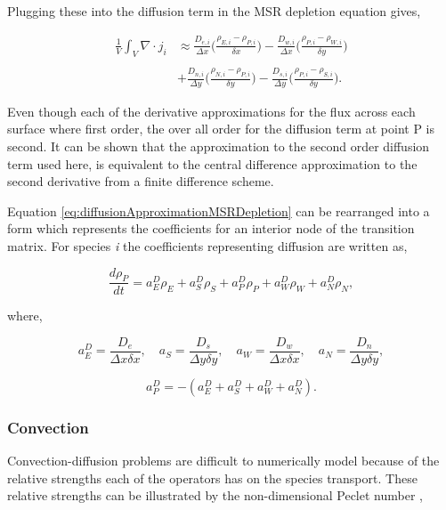 \noindent Plugging these into the diffusion term in the MSR depletion equation gives,

\begin{equation}
\begin{split}
    \frac{1}{V}\int_{V}\nabla \cdot j_{i} &\approx \frac{D_{e,i}}{\Delta x}\bigg(\frac{\rho_{E,i} - \rho_{P,i}}{\delta x}\bigg) - \frac{D_{w,i}}{\Delta x}\bigg(\frac{\rho_{P,i} - \rho_{W,i}}{\delta y}\bigg) \\ \\
    &+ \frac{D_{n,i}}{\Delta y}\bigg(\frac{\rho_{N,i} - \rho_{P,i}}{\delta y}\bigg) - \frac{D_{s,i}}{\Delta y}\bigg(\frac{\rho_{P,i} - \rho_{S,i}}{\delta y}\bigg).
    \label{eq:diffusionApproximationMSRDepletion}
\end{split}
\end{equation}

\noindent Even though each of the derivative approximations for the flux across each surface where first order, the over all order for the diffusion term at point P is second. It can be shown that the approximation to the second order diffusion term used here, is equivalent to the central difference approximation to the second derivative from a finite difference scheme.

Equation \ref{eq:diffusionApproximationMSRDepletion} can be rearranged into a form which represents the coefficients for an interior node of the transition matrix. For species \textit{i} the coefficients representing diffusion are written as, 

\begin{equation}
    \frac{d \rho_{P}}{dt} = a^{D}_{E}\rho_{E} + a^{D}_{S}\rho_{S} + a^{D}_{P}\rho_{P} + a^{D}_{W}\rho_{W} + a^{D}_{N}\rho_{N},
\end{equation}

\noindent where,

\begin{equation*}
    a^{D}_{E} = \frac{D_{e}}{\Delta x \delta x}, \quad 
    a_{S} = \frac{D_{s}}{\Delta y \delta y}, \quad
    a_{W} = \frac{D_{w}}{\Delta x \delta x}, \quad
    a_{N} = \frac{D_{n}}{\Delta y \delta y},
\end{equation*}

\begin{equation*}
    a^{D}_{P} = - (a^{D}_{E} + a^{D}_{S} + a^{D}_{W} + a^{D}_{N}).
\end{equation*}

\subsubsection{Convection}
Convection-diffusion problems are difficult to numerically model because of the relative strengths each of the operators has on the species transport. These relative strengths can be illustrated by the non-dimensional Peclet number \cite{versteeg2007},

